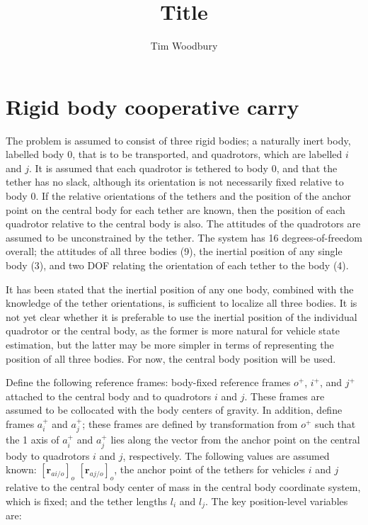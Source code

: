 \documentclass{aiaa-tc}
\title{Title}
\author{Tim Woodbury}
\newcommand{\fr}[1]{$#1^+$} %
\newcommand{\br}[2]{[#1]_{#2}} %
\newcommand{\B}[1]{\textbf{#1}} %
\begin{document}
\maketitle

\section{Rigid body cooperative carry}

The problem is assumed to consist of three rigid bodies; a naturally inert body, labelled body 0, that is to be transported, and quadrotors, which are labelled $i$ and $j$. It is assumed that each quadrotor is tethered to body 0, and that the tether has no slack, although its orientation is not necessarily fixed relative to body 0. If the relative orientations of the tethers and the position of the anchor point on the central body for each tether are known, then the position of each quadrotor relative to the central body is also. The attitudes of the quadrotors are assumed to be unconstrained by the tether. The system has 16 degrees-of-freedom overall; the attitudes of all three bodies (9), the inertial position of any single body (3), and two DOF relating the orientation of each tether to the body (4).

It has been stated that the inertial position of any one body, combined with the knowledge of the tether orientations, is sufficient to localize all three bodies. It is not yet clear whether it is preferable to use the inertial position of the individual quadrotor or the central body, as the former is more natural for vehicle state estimation, but the latter may be more simpler in terms of representing the position of all three bodies. For now, the central body position will be used.

Define the following reference frames: body-fixed reference frames \fr{o}, \fr{i}, and \fr{j} attached to the central body and to quadrotors $i$ and $j$. These frames are assumed to be collocated with the body centers of gravity. In addition, define frames \fr{a_i} and \fr{a_j}; these frames are defined by transformation from \fr{o} such that the 1 axis of \fr{a_i} and \fr{a_j} lies along the vector from the anchor point on the central body to quadrotors $i$ and $j$, respectively. The following values are assumed known: $\br{\B{r}_{ai/o}}{o}$ $\br{\B{r}_{aj/o}}{o}$, the anchor point of the tethers for vehicles $i$ and $j$ relative to the central body center of mass in the central body coordinate system, which is fixed; and the tether lengths $l_i$ and $l_j$. The key position-level variables are:
\end{document}
